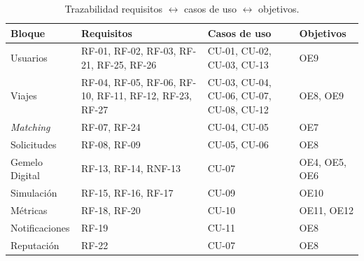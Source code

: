 \begin{table}[H]
  \centering
  \begin{tabularx}{\textwidth}{Y{0.7407} Y{1.4815} Y{0.8889} Y{0.8889}}
    \hline
    \textbf{Bloque} & \textbf{Requisitos} & \textbf{Casos de uso} & \textbf{Objetivos} \\
    \hline
    Usuarios & RF-01, RF-02, RF-03, RF-21, RF-25, RF-26 & CU-01, CU-02, CU-03, CU-13 & OE9 \\
    Viajes & RF-04, RF-05, RF-06, RF-10, RF-11, RF-12, RF-23, RF-27 & CU-03, CU-04, CU-06, CU-07, CU-08, CU-12 & OE8, OE9 \\
    \textit{Matching} & RF-07, RF-24 & CU-04, CU-05 & OE7 \\
    Solicitudes & RF-08, RF-09 & CU-05, CU-06 & OE8 \\
    Gemelo Digital & RF-13, RF-14, RNF-13 & CU-07 & OE4, OE5, OE6 \\
    Simulación & RF-15, RF-16, RF-17 & CU-09 & OE10 \\
    Métricas & RF-18, RF-20 & CU-10 & OE11, OE12 \\
    Notificaciones & RF-19 & CU-11 & OE8 \\
    Reputación & RF-22 & CU-07 & OE8 \\
    \hline
  \end{tabularx}
  \caption{Trazabilidad requisitos \texorpdfstring{$\leftrightarrow$}{<->} casos de uso \texorpdfstring{$\leftrightarrow$}{<->} objetivos.}
  \label{tab:trazabilidad-req}
\end{table}
